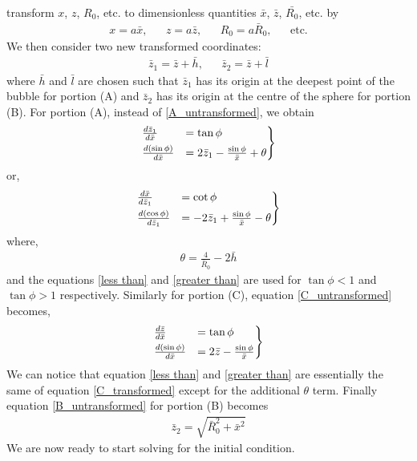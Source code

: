 transform $x$, $z$, $R_0$, etc. to dimensionless quantities $\bar{x}$, $\bar{z}$, $\bar{R_0}$, etc. by
\begin{align}
    x=a\bar{x}, && z=a\bar{z}, && R_0=a\bar{R}_0, && \text{etc.}
\end{align}
We then consider two new transformed coordinates:
\begin{align}
    \bar{z}_1 = \bar{z}+\bar{h}, && \bar{z}_2=\bar{z}+\bar{l}
\end{align}
where $\bar{h}$ and $\bar{l}$ are chosen such that $\bar{z}_1$ has its origin at the deepest point of the bubble for portion (A) and $\bar{z}_2$ has its origin at the centre of the sphere for portion (B). For portion (A), instead of \ref{A_untransformed}, we obtain
\begin{align}\label{less than}
\begin{rcases}   
    \frac{d\bar{z}_1}{d\bar{x}} &= \tan \phi \\
    \frac{d(\sin\phi)}{d\bar{x}} &= 2\bar{z}_1 - \frac{\sin\phi}{\bar{x}} + \theta
\end{rcases} 
\end{align}
or,
\begin{align}\label{greater than}
\begin{rcases}
    \frac{d\bar{x}}{d\bar{z}_1} &= \cot \phi \\
    \frac{d(\cos\phi)}{d\bar{z}_1} &= -2\bar{z}_1 + \frac{\sin\phi}{\bar{x}} - \theta
\end{rcases}
\end{align}
where,
\begin{align}
    \theta = \frac{4}{\bar{R}_0} - 2\bar{h}
\end{align}
and the equations \ref{less than} and \ref{greater than} are used for $\tan\phi <1$ and $\tan\phi >1$ respectively. Similarly for portion (C), equation \ref{C_untransformed} becomes,
\begin{align}\label{C_transformed}
\begin{rcases}   
    \frac{d\bar{z}}{d\bar{x}} &= \tan \phi \\
    \frac{d(\sin\phi)}{d\bar{x}} &= 2\bar{z} - \frac{\sin\phi}{\bar{x}}
\end{rcases} 
\end{align}
We can notice that equation \ref{less than} and \ref{greater than} are essentially the same of equation \ref{C_transformed} except for the additional $\theta$ term. Finally equation \ref{B_untransformed} for portion (B) becomes
\begin{align}\label{Eq_B}
    \bar{z}_2 = \sqrt{ \bar{R}_0^2+\bar{x}^2}
\end{align}
We are now ready to start solving for the initial condition.

